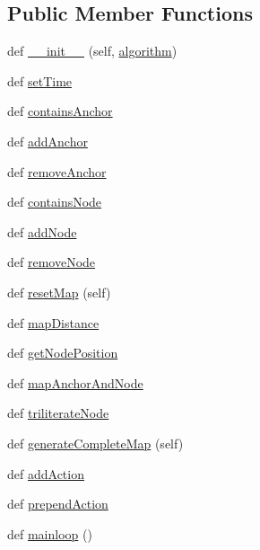\subsection*{Public Member Functions}
\begin{DoxyCompactItemize}
\item 
def \mbox{\hyperlink{classsimlib_1_1hub_1_1_hub_aef9d9e20c18f3529bc77a67785994a3d}{\+\_\+\+\_\+init\+\_\+\+\_\+}} (self, \mbox{\hyperlink{classsimlib_1_1hub_1_1_hub_aca8e342d4c6bc56b75d88e0c715f817c}{algorithm}})
\item 
def \mbox{\hyperlink{classsimlib_1_1hub_1_1_hub_aee3b45cd9600d3c35c92bdb4871de586}{set\+Time}}
\item 
def \mbox{\hyperlink{classsimlib_1_1hub_1_1_hub_a32d013c48e8bf89093c30a847ee7f3c7}{contains\+Anchor}}
\item 
def \mbox{\hyperlink{classsimlib_1_1hub_1_1_hub_abdae7847cfc28517804da006cb55ee65}{add\+Anchor}}
\item 
def \mbox{\hyperlink{classsimlib_1_1hub_1_1_hub_abdcb60d6386e88f57ae1f111aae00cf5}{remove\+Anchor}}
\item 
def \mbox{\hyperlink{classsimlib_1_1hub_1_1_hub_a2e1b1b852d6a72f8511a1a66c98f938e}{contains\+Node}}
\item 
def \mbox{\hyperlink{classsimlib_1_1hub_1_1_hub_a91fe6d6f8365496de31b2550129bd27b}{add\+Node}}
\item 
def \mbox{\hyperlink{classsimlib_1_1hub_1_1_hub_a8adca099b501b37519bc755d47b43c35}{remove\+Node}}
\item 
def \mbox{\hyperlink{classsimlib_1_1hub_1_1_hub_acce9179de32abdcd091534e2d00b9156}{reset\+Map}} (self)
\item 
def \mbox{\hyperlink{classsimlib_1_1hub_1_1_hub_a6c7bcdb32a543f23d91f6c9fb5a684d3}{map\+Distance}}
\item 
def \mbox{\hyperlink{classsimlib_1_1hub_1_1_hub_a1f9e992128dff4752b3890c7678cec22}{get\+Node\+Position}}
\item 
def \mbox{\hyperlink{classsimlib_1_1hub_1_1_hub_a50cb83deb0326428d75dc520789f61c8}{map\+Anchor\+And\+Node}}
\item 
def \mbox{\hyperlink{classsimlib_1_1hub_1_1_hub_a131d5401102438d428e04a4caa24bd68}{triliterate\+Node}}
\item 
def \mbox{\hyperlink{classsimlib_1_1hub_1_1_hub_ad30ddbad3c34c11f7a392217578e39ad}{generate\+Complete\+Map}} (self)
\item 
def \mbox{\hyperlink{classsimlib_1_1hub_1_1_hub_aa1690052a9b14a68a6dff3dba2d8103e}{add\+Action}}
\item 
def \mbox{\hyperlink{classsimlib_1_1hub_1_1_hub_a1ee175090ec7c5b49a7ce93fca78e4cc}{prepend\+Action}}
\item 
def \mbox{\hyperlink{classsimlib_1_1hub_1_1_hub_ae460fbee94cf90c0c9f7dbce6770c015}{mainloop}} ()
\end{DoxyCompactItemize}
